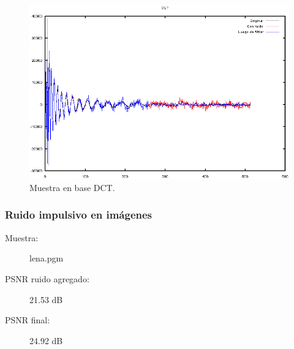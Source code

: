 \documentclass[a4paper,10pt,twoside]{article}
\begin{document}
\begin{figure}[H]
  \centering
  \includegraphics[width=15cm]{graficos/dopp_impulsivo_atenuar_dct.png} 
  \caption{Muestra en base DCT.}
\end{figure}


\subsubsection{Ruido impulsivo en imágenes}

\begin{description}
  \item[Muestra:] lena.pgm
  \item[PSNR ruido agregado:] 21.53 dB
  \item[PSNR final:] 24.92 dB
\end{description}
\end{document}
